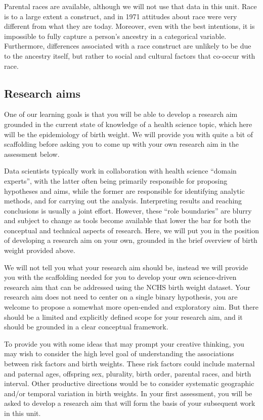 Parental races are available, although we will not use that data in this unit.  Race is to a large extent a construct, and in 1971 attitudes about race were very different from what they are today.  Moreover, even with the best intentions, it is impossible to fully capture a person's ancestry in a categorical variable. Furthermore, differences associated with a race construct are unlikely to be due to the ancestry itself, but rather to social and cultural factors that co-occur with race.

\subsection{Research aims}

One of our learning goals is that you will be able to develop a research aim grounded in the current state of knowledge of a health science topic, which here will be the epidemiology of birth weight.  We will provide you with quite a bit of scaffolding before asking you to come up with your own research aim in the assessment below.

Data scientists typically work in collaboration with health science ``domain experts'', with the latter often being primarily responsible for proposing hypotheses and aims, while the former are responsible for identifying analytic methods, and for carrying out the analysis.  Interpreting results and reaching conclusions is usually a joint effort.  However, these ``role boundaries'' are blurry and subject to change as tools become available that lower the bar for both the conceptual and technical aspects of research.  Here, we will put you in the position of developing a research aim on your own, grounded in the brief overview of birth weight provided above.

We will not tell you what your research aim should be, instead we will provide you with the scaffolding needed for you to develop your own science-driven research aim that can be addressed using the NCHS birth weight dataset.  Your research aim does not need to center on a single binary hypothesis, you are welcome to propose a somewhat more open-ended and exploratory aim.  But there should be a limited and explicitly defined scope for your research aim, and it should be grounded in a clear conceptual framework.

To provide you with some ideas that may prompt your creative thinking, you may wish to consider the high level goal of understanding the associations between risk factors and birth weights.  These risk factors could include maternal and paternal ages, offspring sex, plurality, birth order, parental races, and birth interval.  Other productive directions would be to consider systematic geographic and/or temporal variation in birth weights.  In your first assessment, you will be asked to develop a research aim that will form the basis of your subsequent work in this unit.


